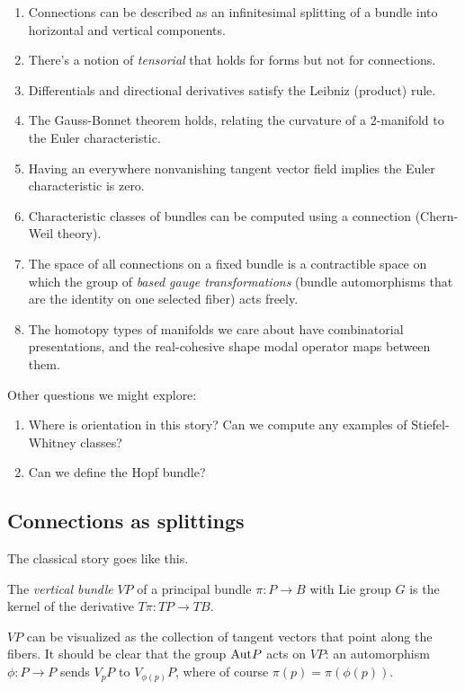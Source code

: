 \documentclass[12pt]{article}
\begin{document}
\begin{enumerate}
\item Connections can be described as an infinitesimal splitting of a bundle into horizontal and vertical components.
\item There's a notion of \emph{tensorial} that holds for forms but not for connections.
\item Differentials and directional derivatives satisfy the Leibniz (product) rule.
\item The Gauss-Bonnet theorem holds, relating the curvature of a 2-manifold to the Euler characteristic.
\item Having an everywhere nonvanishing tangent vector field implies the Euler characteristic is zero.
\item Characteristic classes of bundles can be computed using a connection (Chern-Weil theory).
\item The space of all connections on a fixed bundle is a contractible space on which the group of \emph{based gauge transformations} (bundle automorphisms that are the identity on one selected fiber) acts freely.
\item The homotopy types of manifolds we care about have combinatorial presentations, and the real-cohesive shape modal operator maps between them.
\end{enumerate}

Other questions we might explore:
\begin{enumerate}
\item Where is orientation in this story? Can we compute any examples of Stiefel-Whitney classes?
\item Can we define the Hopf bundle?
\end{enumerate}

\subsection{Connections as splittings}

The classical story goes like this.

\begin{mydef}
The \emph{vertical bundle} \( VP \) of a principal bundle \( \pi:P\to B \) with Lie group \( G \) is the kernel of the derivative \( T\pi:TP\to TB \). 
\end{mydef}

\( VP \) can be visualized as the collection of tangent vectors that point along the fibers. It should be clear that the group \( \mathrm{Aut} P \) acts on \( VP \): an automorphism \( \phi:P\to P \) sends \( V_pP \) to \( V_{\phi(p)}P \), where of course \( \pi(p)=\pi(\phi(p)) \).
\end{document}
